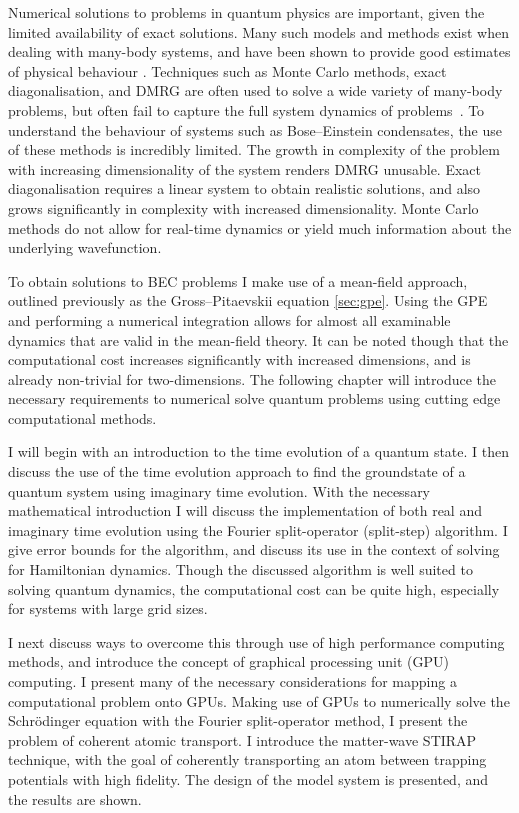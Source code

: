 Numerical solutions to problems in quantum physics are important, given the limited availability of exact solutions. Many such models and methods exist when dealing with many-body systems, and have been shown to provide good estimates of physical behaviour \cite{}. Techniques such as Monte Carlo methods, exact diagonalisation, and DMRG are often used to solve a wide variety of many-body problems, but often fail to capture the full system dynamics of problems~\cite{}. To understand the behaviour of systems such as Bose--Einstein condensates, the use of these methods is incredibly limited. The growth in complexity of the problem with increasing dimensionality of the system renders DMRG unusable. Exact diagonalisation requires a linear system to obtain realistic solutions, and also grows significantly in complexity with increased dimensionality. Monte Carlo methods do not allow for real-time dynamics or yield much information about the underlying wavefunction.

To obtain solutions to BEC problems I make use of a mean-field approach, outlined previously as the Gross--Pitaevskii equation \ref{sec:gpe}. Using the GPE and performing a numerical integration allows for almost all examinable dynamics that are valid in the mean-field theory. It can be noted though that the computational cost increases significantly with increased dimensions, and is already non-trivial for two-dimensions. The following chapter will introduce the necessary requirements to numerical solve quantum problems using cutting edge computational methods.

I will begin with an introduction to the time evolution of a quantum state. I then discuss the use of the time evolution approach to find the groundstate of a quantum system using imaginary time evolution. With the necessary mathematical introduction I will discuss the implementation of both real and imaginary time evolution using the Fourier split-operator (split-step) algorithm. I give error bounds for the algorithm, and discuss its use in the context of solving for Hamiltonian dynamics. Though the discussed algorithm is well suited to solving quantum dynamics, the computational cost can be quite high, especially for systems with large grid sizes.

I next discuss ways to overcome this through use of high performance computing methods, and introduce the concept of graphical processing unit (GPU) computing. I present many of the necessary considerations for mapping a computational problem onto GPUs. Making use of GPUs to numerically solve the Schr\"odinger equation with the Fourier split-operator method, I present the problem of coherent atomic transport. I introduce the matter-wave STIRAP technique, with the goal of coherently transporting an atom between trapping potentials with high fidelity. The design of the model system is presented, and the results are shown.

